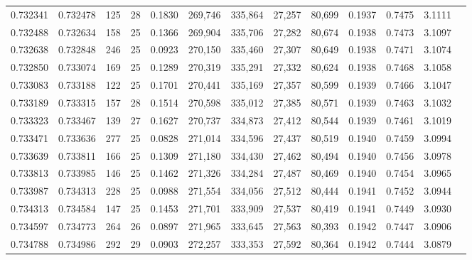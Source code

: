 \begin{tabular}{rrrrrrrrrrrrr}
0.732341 & 0.732478 &   125 &  28 &                                     0.1830 & 269,746 & 335,864 &  27,257 &  80,699 & 0.1937 & 0.7475 & 3.1111 \\
0.732488 & 0.732634 &   158 &  25 &                                     0.1366 & 269,904 & 335,706 &  27,282 &  80,674 & 0.1938 & 0.7473 & 3.1097 \\
0.732638 & 0.732848 &   246 &  25 &                                     0.0923 & 270,150 & 335,460 &  27,307 &  80,649 & 0.1938 & 0.7471 & 3.1074 \\
0.732850 & 0.733074 &   169 &  25 &                                     0.1289 & 270,319 & 335,291 &  27,332 &  80,624 & 0.1938 & 0.7468 & 3.1058 \\
0.733083 & 0.733188 &   122 &  25 &                                     0.1701 & 270,441 & 335,169 &  27,357 &  80,599 & 0.1939 & 0.7466 & 3.1047 \\
0.733189 & 0.733315 &   157 &  28 &                                     0.1514 & 270,598 & 335,012 &  27,385 &  80,571 & 0.1939 & 0.7463 & 3.1032 \\
0.733323 & 0.733467 &   139 &  27 &                                     0.1627 & 270,737 & 334,873 &  27,412 &  80,544 & 0.1939 & 0.7461 & 3.1019 \\
0.733471 & 0.733636 &   277 &  25 &                                     0.0828 & 271,014 & 334,596 &  27,437 &  80,519 & 0.1940 & 0.7459 & 3.0994 \\
0.733639 & 0.733811 &   166 &  25 &                                     0.1309 & 271,180 & 334,430 &  27,462 &  80,494 & 0.1940 & 0.7456 & 3.0978 \\
0.733813 & 0.733985 &   146 &  25 &                                     0.1462 & 271,326 & 334,284 &  27,487 &  80,469 & 0.1940 & 0.7454 & 3.0965 \\
0.733987 & 0.734313 &   228 &  25 &                                     0.0988 & 271,554 & 334,056 &  27,512 &  80,444 & 0.1941 & 0.7452 & 3.0944 \\
0.734313 & 0.734584 &   147 &  25 &                                     0.1453 & 271,701 & 333,909 &  27,537 &  80,419 & 0.1941 & 0.7449 & 3.0930 \\
0.734597 & 0.734773 &   264 &  26 &                                     0.0897 & 271,965 & 333,645 &  27,563 &  80,393 & 0.1942 & 0.7447 & 3.0906 \\
0.734788 & 0.734986 &   292 &  29 &                                     0.0903 & 272,257 & 333,353 &  27,592 &  80,364 & 0.1942 & 0.7444 & 3.0879 \\

\end{tabular}
